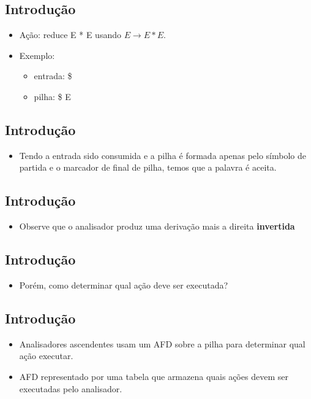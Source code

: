 \documentclass[11pt]{article}
\begin{document}
\subsection*{Introdução}
\label{sec:org81807ca}

\begin{itemize}
\item Ação: reduce E * E usando \(E\to E * E\).

\item Exemplo:
\begin{itemize}
\item entrada: \$
\item pilha: \$ E
\end{itemize}
\end{itemize}
\subsection*{Introdução}
\label{sec:orgfd27892}

\begin{itemize}
\item Tendo a entrada sido consumida e a pilha é formada apenas pelo símbolo de partida e o marcador de final de pilha,
temos que a palavra é aceita.
\end{itemize}
\subsection*{Introdução}
\label{sec:org077efeb}

\begin{itemize}
\item Observe que o analisador produz uma derivação mais a direita \textbf{invertida}
\end{itemize}
\subsection*{Introdução}
\label{sec:org425ea64}

\begin{itemize}
\item Porém, como determinar qual ação deve ser executada?
\end{itemize}
\subsection*{Introdução}
\label{sec:org8695d98}

\begin{itemize}
\item Analisadores ascendentes usam um AFD sobre a pilha para
determinar qual ação executar.

\item AFD representado por uma tabela que armazena quais ações
devem ser executadas pelo analisador.
\end{itemize}
\end{document}
